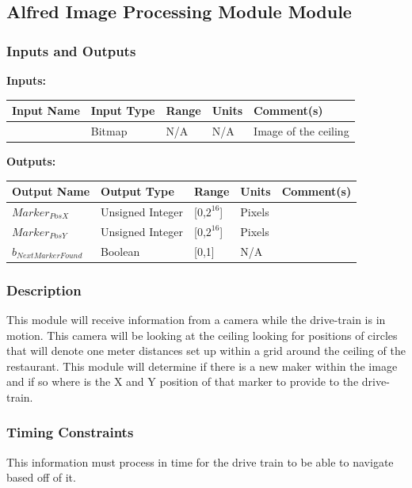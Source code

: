 \documentclass [10pt]{article}
\begin{document}
\subsection{Alfred Image Processing Module Module}

\subsubsection{Inputs and Outputs}

\textbf{Inputs: } 

\begin{longtable}{|l|l|l|l|l|}\hline 
	\rowcolor{tableCell}Input Name & Input Type & Range & Units & Comment(s) \\ \hline
	 & Bitmap &  N/A & N/A & Image of the ceiling  \\ \hline
\end{longtable}

\textbf{Outputs: } 

\begin{longtable}{|l|l|l|l|l|}\hline 
	\rowcolor{tableCell}Output Name & Output Type & Range & Units & Comment(s) \\ \hline
	$ Marker_{PosX} $ & Unsigned Integer & [0,$2^{16}$] & Pixels &  \\ \hline
	$ Marker_{PosY} $ & Unsigned Integer & [0,$2^{16}$] & Pixels & \\ \hline
	$ b_{NextMarkerFound} $ & Boolean & [0,1] & N/A & \\ \hline
\end{longtable}

\subsubsection{Description}
This module will receive information from a camera while the drive-train is in motion. This camera will be looking at the ceiling looking for positions of circles that will denote one meter distances set up within a grid around the ceiling of the restaurant. This module will determine if there is a new maker within the image and if so where is the X and Y position of that marker to provide to the drive-train.

\subsubsection{Timing Constraints}
This information must process in time for the drive train to be able to navigate based off of it.
\end{document}
